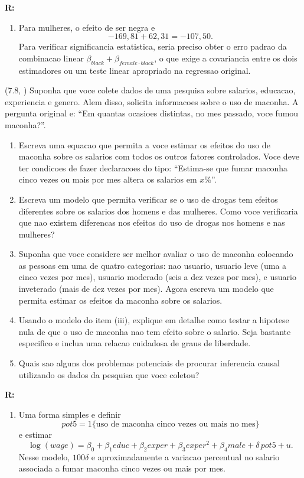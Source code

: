 \documentclass[12pt,letterpaper, onecolumn]{exam}
\renewenvironment{solution}
{\par\noindent\textbf{R:}\enspace\color{blue}}
{\par\color{black}}
\begin{document}
\begin{questions}
\begin{solution}
\begin{enumerate}[label=(\roman*)]
    \item Para mulheres, o efeito de ser negra e
    \[
    -169,81 + 62,31 = -107,50.
    \]
    Para verificar significancia estatistica, seria preciso obter o erro padrao da combinacao linear \(\beta_{black}+\beta_{female\cdot black}\), o que exige a covariancia entre os dois estimadores ou um teste linear apropriado na regressao original.
\end{enumerate}
\end{solution}

\vspace{0.7cm}

\question (7.8, \citep{wooldridge2016}) Suponha que voce colete dados de uma pesquisa sobre salarios, educacao, experiencia e genero. Alem disso, solicita informacoes sobre o uso de maconha. A pergunta original e: ``Em quantas ocasioes distintas, no mes passado, voce fumou maconha?''.
\begin{enumerate}[label=(\roman*)]
    \item Escreva uma equacao que permita a voce estimar os efeitos do uso de maconha sobre os salarios com todos os outros fatores controlados. Voce deve ter condicoes de fazer declaracoes do tipo: ``Estima-se que fumar maconha cinco vezes ou mais por mes altera os salarios em \(x\%\)''.
    \item Escreva um modelo que permita verificar se o uso de drogas tem efeitos diferentes sobre os salarios dos homens e das mulheres. Como voce verificaria que nao existem diferencas nos efeitos do uso de drogas nos homens e nas mulheres?
    \item Suponha que voce considere ser melhor avaliar o uso de maconha colocando as pessoas em uma de quatro categorias: nao usuario, usuario leve (uma a cinco vezes por mes), usuario moderado (seis a dez vezes por mes), e usuario inveterado (mais de dez vezes por mes). Agora escreva um modelo que permita estimar os efeitos da maconha sobre os salarios.
    \item Usando o modelo do item (iii), explique em detalhe como testar a hipotese nula de que o uso de maconha nao tem efeito sobre o salario. Seja bastante especifico e inclua uma relacao cuidadosa de graus de liberdade.
    \item Quais sao alguns dos problemas potenciais de procurar inferencia causal utilizando os dados da pesquisa que voce coletou?
\end{enumerate}

\begin{solution}
\begin{enumerate}[label=(\roman*)]
    \item Uma forma simples e definir
    \[
    pot5 = 1\{\text{uso de maconha cinco vezes ou mais no mes}\}
    \]
    e estimar
    \[
    \log(wage)=\beta_0+\beta_1 educ+\beta_2 exper+\beta_3 exper^2+\beta_4 male+\delta\,pot5+u.
    \]
    Nesse modelo, \(100\delta\) e aproximadamente a variacao percentual no salario associada a fumar maconha cinco vezes ou mais por mes.


\end{enumerate}
\end{solution}
\end{questions}
\end{document}
